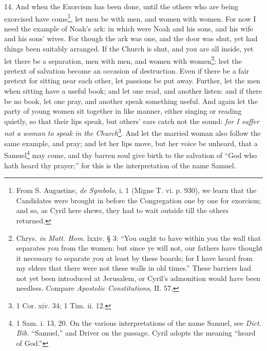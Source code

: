 14. And when the Exorcism has been done, until the others who are being exorcised have come\footnote{From S. Augustine, \emph{de Symbolo}, i. 1 (Migne T. vi. p. 930), we learn that the Candidates were brought in before the Congregation one by one for exorcism; and so, as Cyril here shews, they had to wait outside till the others returned.}, let men be with men, and women with women. For now I need the example of Noah’s ark: in which were Noah and his sons, and his wife and his sons’ wives. For though the ark was one, and the door was shut, yet had things been suitably arranged. If the Church is shut, and you are all inside, yet let there be a separation, men with men, and women with women\footnote{Chrys. \emph{in Matt. Hom}. lxxiv. § 3: “You ought to have within you the wall that separates you from the women: but since ye will not, our fathers have thought it necessary to separate you at least by these boards; for I have heard from my elders that there were not these walls in old times.” These barriers had not yet been introduced at Jerusalem, or Cyril’s admonition would have been needless. Compare \emph{Apostolic Constitutions}, II. 57.}: lest the pretext of salvation become an occasion of destruction. Even if there be a fair pretext for sitting near each other, let passions be put away. Further, let the men when sitting have a useful book; and let one read, and another listen: and if there be no book, let one pray, and another speak something useful. And again let the party of young women sit together in like manner, either singing or reading quietly, so that their lips speak, but others’ ears catch not the sound: \emph{for I suffer not a woman to speak in the Church}\footnote{1 Cor. xiv. 34; 1 Tim. ii. 12.}. And let the married woman also follow the same example, and pray; and let her lips move, but her voice be unheard, that a Samuel\footnote{1 Sam. i. 13, 20. On the various interpretations of the name Samuel, see \emph{Dict. Bib.} “Samuel,” and Driver on the passage. Cyril adopts the meaning “heard of God.”} may come, and thy barren soul give birth to the salvation of “God who hath heard thy prayer;” for this is the interpretation of the name Samuel.

